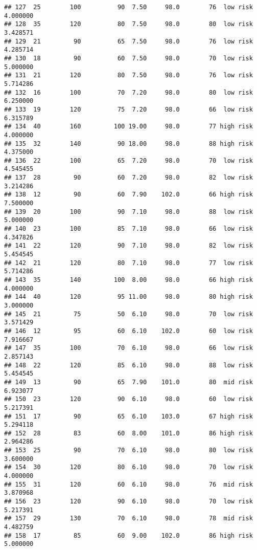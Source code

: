 \documentclass[
  ignorenonframetext,
]{beamer}
\begin{document}
\begin{frame}[fragile]
\begin{verbatim}
## 127  25        100          90  7.50     98.0        76  low risk      4.000000
## 128  35        120          80  7.50     98.0        80  low risk      3.428571
## 129  21         90          65  7.50     98.0        76  low risk      4.285714
## 130  18         90          60  7.50     98.0        70  low risk      5.000000
## 131  21        120          80  7.50     98.0        76  low risk      5.714286
## 132  16        100          70  7.20     98.0        80  low risk      6.250000
## 133  19        120          75  7.20     98.0        66  low risk      6.315789
## 134  40        160         100 19.00     98.0        77 high risk      4.000000
## 135  32        140          90 18.00     98.0        88 high risk      4.375000
## 136  22        100          65  7.20     98.0        70  low risk      4.545455
## 137  28         90          60  7.20     98.0        82  low risk      3.214286
## 138  12         90          60  7.90    102.0        66 high risk      7.500000
## 139  20        100          90  7.10     98.0        88  low risk      5.000000
## 140  23        100          85  7.10     98.0        66  low risk      4.347826
## 141  22        120          90  7.10     98.0        82  low risk      5.454545
## 142  21        120          80  7.10     98.0        77  low risk      5.714286
## 143  35        140         100  8.00     98.0        66 high risk      4.000000
## 144  40        120          95 11.00     98.0        80 high risk      3.000000
## 145  21         75          50  6.10     98.0        70  low risk      3.571429
## 146  12         95          60  6.10    102.0        60  low risk      7.916667
## 147  35        100          70  6.10     98.0        66  low risk      2.857143
## 148  22        120          85  6.10     98.0        88  low risk      5.454545
## 149  13         90          65  7.90    101.0        80  mid risk      6.923077
## 150  23        120          90  6.10     98.0        60  low risk      5.217391
## 151  17         90          65  6.10    103.0        67 high risk      5.294118
## 152  28         83          60  8.00    101.0        86 high risk      2.964286
## 153  25         90          70  6.10     98.0        80  low risk      3.600000
## 154  30        120          80  6.10     98.0        70  low risk      4.000000
## 155  31        120          60  6.10     98.0        76  mid risk      3.870968
## 156  23        120          90  6.10     98.0        70  low risk      5.217391
## 157  29        130          70  6.10     98.0        78  mid risk      4.482759
## 158  17         85          60  9.00    102.0        86 high risk      5.000000

\end{verbatim}
\end{frame}
\end{document}
